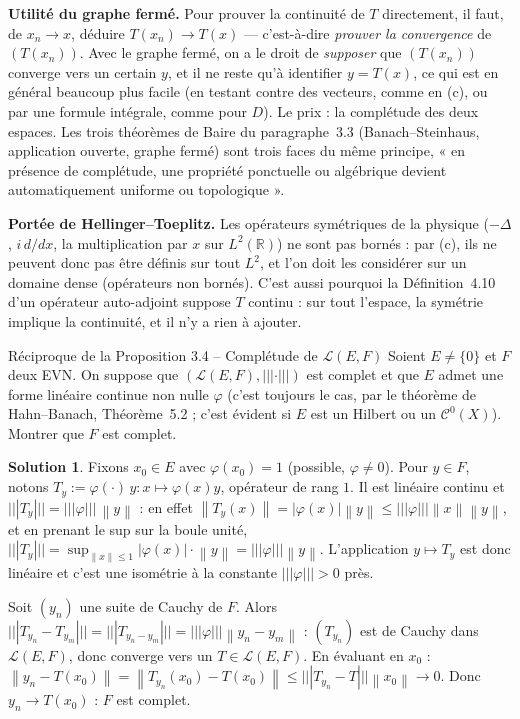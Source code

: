 \documentclass[11pt,a4paper]{article}
\newcommand{\R}{\mathbb{R}}
\newcommand{\norm}[1]{\left\|#1\right\|}
\newcommand{\opnorm}[1]{|\!|\!|#1|\!|\!|}
\newcommand{\Lc}{\mathcal{L}}
\newcommand{\Cz}{\mathcal{C}^0}
\theoremstyle{definition}
\newtheorem*{solution}{Solution}
\begin{document}
\begin{pointcle}
\textbf{Utilité du graphe fermé.} Pour prouver la continuité de $T$ directement, il faut, de $x_n\to x$, déduire $T(x_n)\to T(x)$ — c'est-à-dire \emph{prouver la convergence} de $(T(x_n))$. Avec le graphe fermé, on a le droit de \emph{supposer} que $(T(x_n))$ converge vers un certain $y$, et il ne reste qu'à identifier $y=T(x)$, ce qui est en général beaucoup plus facile (en testant contre des vecteurs, comme en (c), ou par une formule intégrale, comme pour $D$). Le prix : la complétude des deux espaces. Les trois théorèmes de Baire du paragraphe~3.3 (Banach--Steinhaus, application ouverte, graphe fermé) sont trois faces du même principe, « en présence de complétude, une propriété ponctuelle ou algébrique devient automatiquement uniforme ou topologique ».
\end{pointcle}

\begin{commentaire}
\textbf{Portée de Hellinger--Toeplitz.} Les opérateurs symétriques de la physique ($-\Delta$, $i\,d/dx$, la multiplication par $x$ sur $L^2(\R)$) ne sont pas bornés : par (c), ils ne peuvent donc pas être définis sur tout $L^2$, et l'on doit les considérer sur un domaine dense (opérateurs non bornés). C'est aussi pourquoi la Définition~4.10 d'un opérateur auto-adjoint suppose $T$ continu : sur tout l'espace, la symétrie implique la continuité, et il n'y a rien à ajouter.
\end{commentaire}

\begin{exo}{Réciproque de la Proposition 3.4 -- Complétude de $\Lc(E,F)$}
Soient $E\ne\{0\}$ et $F$ deux EVN. On suppose que $(\Lc(E,F),\opnorm\cdot)$ est complet et que $E$ admet une forme linéaire continue non nulle $\varphi$ (c'est toujours le cas, par le théorème de Hahn--Banach, Théorème~5.2 ; c'est évident si $E$ est un Hilbert ou un $\Cz(X)$). Montrer que $F$ est complet.
\end{exo}

\begin{solution}
Fixons $x_0\in E$ avec $\varphi(x_0)=1$ (possible, $\varphi\ne0$). Pour $y\in F$, notons $T_y:=\varphi(\cdot)\,y:x\mapsto\varphi(x)y$, opérateur de rang $1$. Il est linéaire continu et $\opnorm{T_y}=\opnorm\varphi\,\norm y$ : en effet $\norm{T_y(x)}=|\varphi(x)|\norm y\le\opnorm\varphi\norm x\norm y$, et en prenant le sup sur la boule unité, $\opnorm{T_y}=\sup_{\norm x\le1}|\varphi(x)|\cdot\norm y=\opnorm\varphi\norm y$. L'application $y\mapsto T_y$ est donc linéaire et c'est une isométrie à la constante $\opnorm\varphi>0$ près.

Soit $(y_n)$ une suite de Cauchy de $F$. Alors $\opnorm{T_{y_n}-T_{y_m}}=\opnorm{T_{y_n-y_m}}=\opnorm\varphi\norm{y_n-y_m}$ : $(T_{y_n})$ est de Cauchy dans $\Lc(E,F)$, donc converge vers un $T\in\Lc(E,F)$. En évaluant en $x_0$ : $\norm{y_n-T(x_0)}=\norm{T_{y_n}(x_0)-T(x_0)}\le\opnorm{T_{y_n}-T}\norm{x_0}\to0$. Donc $y_n\to T(x_0)$ : $F$ est complet.
\end{solution}
\end{document}
